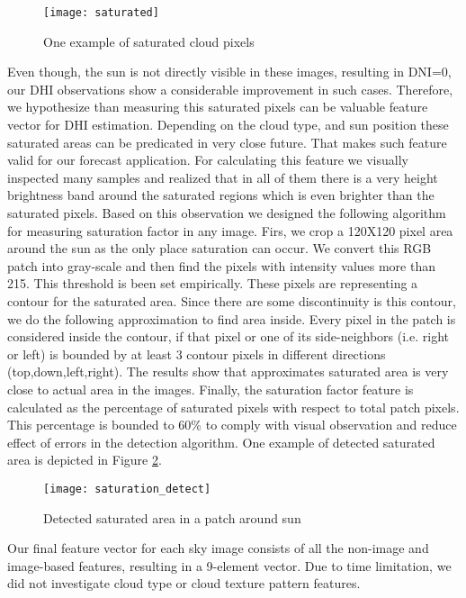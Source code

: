 \begin{figure}[h]
\caption{One example of saturated cloud pixels}
\label{fig:saturated_example}
\texttt{[image: saturated]}
\centering
\end{figure}

Even though, the sun is not directly visible in these images, resulting in DNI=0, our DHI observations show a considerable improvement in such cases. Therefore, we hypothesize than measuring this saturated pixels can be valuable feature vector for DHI estimation. Depending on the cloud type, and sun position these saturated areas can be predicated in very close future. That makes such feature valid for our forecast application. For calculating this feature we visually inspected many samples and realized that in all of them there is a very height brightness band around the saturated regions which is even brighter than the saturated pixels. Based on this observation we designed the following algorithm for measuring saturation factor in any image. Firs, we crop a 120X120 pixel area around the sun as the only place saturation can occur. We convert this RGB patch into gray-scale and then find the pixels with intensity values more than 215. This threshold is been set empirically. These pixels are representing a contour for the saturated area. Since there are some discontinuity is this contour, we do the following approximation to find area inside. Every pixel in the patch is considered inside the contour, if that pixel or one of its side-neighbors (i.e. right or left) is bounded by at least 3 contour pixels in different directions (top,down,left,right). The results show that approximates saturated area is very close to actual area in the images. Finally, the saturation factor feature is calculated as the percentage of saturated pixels with respect to total patch pixels. This percentage is bounded to 60\% to comply with visual observation and reduce effect of errors in the detection algorithm. One example of detected saturated area is depicted in Figure \ref{fig:saturated_result_example}.

\begin{figure}[h]
\caption{Detected saturated area in a patch around sun}
\label{fig:saturated_result_example}
\texttt{[image: saturation\_detect]}
\centering
\end{figure}

Our final feature vector for each sky image consists of all the non-image and image-based features, resulting in a 9-element vector. Due to time limitation, we did not investigate cloud type or cloud texture pattern features.

